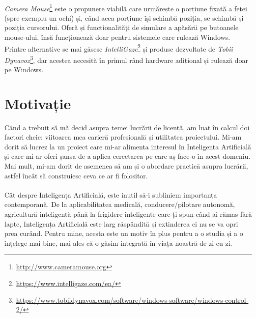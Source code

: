 \paragraph{}
\emph{Camera Mouse}\footnote{\url{http://www.cameramouse.org}} este o propunere viabilă care urmărește o porțiune fixată a feței (spre exemplu un ochi) și, când acea porțiune își schimbă poziția, se schimbă și poziția cursorului.
Oferă și functionalități de simulare a apăsării pe butoanele mouse-ului, însă funcționează doar pentru sistemele care rulează Windows.
Printre alternative se mai găsesc \emph{IntelliGaze}\footnote{\url{https://www.intelligaze.com/en/}} și produse dezvoltate de \emph{Tobii Dynavox}\footnote{\url{https://www.tobiidynavox.com/software/windows-software/windows-control-2/}}, dar acestea necesită în primul rând hardware adițional și rulează doar pe Windows.

\section*{Motivație}
\paragraph{}
Când a trebuit să mă decid asupra temei lucrării de licență, am luat în calcul doi factori cheie: viitoarea mea carieră profesională și utilitatea proiectului.
Mi-am dorit să lucrez la un proiect care mi-ar alimenta interesul în Inteligența Artificială și care mi-ar oferi șansa de a aplica cercetarea pe care aș face-o în acest domeniu.
Mai mult, mi-am dorit de asemenea să am și o abordare practică asupra lucrării, astfel încât să construiesc ceva ce ar fi folositor.

\paragraph{}
Cât despre Inteligența Artificială, este inutil să-i subliniem importanța contemporană.
De la aplicabilitatea medicală, conducere/pilotare autonomă, agricultură inteligentă până la frigidere inteligente care-ți spun când ai rămas fără lapte, Inteligența Artificială este larg răspândită și extinderea ei nu se va opri prea curând.
Pentru mine, acesta este un motiv în plus pentru a o studia și a o înțelege mai bine, mai ales că o găsim integrată în viața noastră de zi cu zi.



